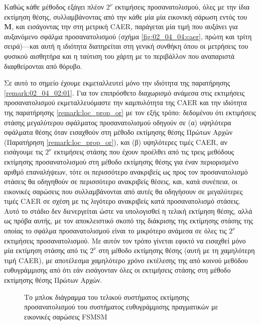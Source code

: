 Καθώς κάθε μέθοδος εξάγει πλέον $2^\nu$ εκτιμήσεις προσανατολισμού, όλες με την
ίδια εκτίμηση θέσης, συλλαμβάνοντας από την κάθε μία μία εικονική σάρωση εντός
του $\bm{M}$, και εισάγοντας την στη μετρική CAER, παράγεται μία τιμή που
αυξάνει για αυξανόμενο σφάλμα προσανατολισμού (σχήμα \ref{fig:02_04_04:caer},
πρώτη και τρίτη σειρά)---και αυτή η ιδιότητα διατηρείται στη γενική συνθήκη
όπου οι μετρήσεις του φυσικού αισθητήρα και η ταύτιση του χάρτη με το
περιβάλλον που αναπαριστά διαφθείρονται από θόρυβο.

Σε αυτό το σημείο έχουμε εκμεταλλευτεί μόνο την ιδιότητα της παρατήρησης
\ref{remark:02_04_02:01}. Για τον επιπρόσθετο διαχωρισμό ανάμεσα στις
εκτιμήσεις προσανατολισμού εκμεταλλευόμαστε την καμπυλότητα της CAER και την
ιδιότητα της παρατήρησης \ref{remark:loc_prop_or} με τον εξής τρόπο: δεδομένου
ότι εκτιμήσεις στάσης μεγαλύτερου σφάλματος  προσανατολισμού οδηγούν σε (α)
υψηλότερα σφάλματα θέσης όταν εισαχθούν στη μέθοδο εκτίμησης θέσης Πρώτων Αρχών
(Παρατήρηση \ref{remark:loc_prop_or}), και (β) υψηλότερες τιμές CAER, αν
εισάγουμε τις $2^\nu$ εκτιμήσεις στάσης που έχουν προέλθει από τις τρεις
μεθόδους εκτίμησης προσανατολισμού στη μέθοδο εκτίμησης θέσης για έναν
περιορισμένο αριθμό επαναλήψεων, τότε οι περισσότερο ανακριβείς ως προς τον
προσανατολισμό στάσεις θα οδηγηθούν σε περισσότερο ανακριβείς θέσεις, και, κατά
συνέπεια, οι εικονικές σαρώσεις που συλλαμβάνονται από αυτές θα οδηγήσουν σε
μεγαλύτερες τιμές CAER σε σχέση με τις λιγότερο ανακριβείς κατά προσανατολισμό
στάσεις. Αυτό το στάδιο δεν διενεργείται ώστε να υπολογισθεί η τελική εκτίμηση
θέσης, αλλά ως πρόβα αυτής, με τον αποκλειστικό σκοπό της διάκρισης της
εκτίμησης στάσης της οποίας το σφάλμα προσανατολισμού είναι το μικρότερο
ανάμεσα σε όλες τις $2^\nu$ εκτιμήσεις προσανατολισμού. Με αυτόν τον τρόπο
γίνεται εφικτό να εισαχθεί μόνο μία εκτίμηση στάσης από τις $2^\nu$ στη μέθοδο
εκτίμησης θέσης (αυτή με τη χαμηλότερη τιμή CAER), με αποτέλεσμα χαμηλότερο
χρόνο εκτέλεσης της από κοινού μεθόδου ευθυγράμμισης από ότι εάν εισάγονταν
όλες οι εκτιμήσεις στάσης στη μέθοδο εκτίμησης θέσης Πρώτων Αρχών.

\begin{figure}\centering
  
  \caption{\small Το μπλοκ διάγραμμα του τελικού συστήματος εκτίμησης
           προσανατολισμού του συστήματος ευθυγράμμισης πραγματικών με εικονικές
           σαρώσεις FSMSM}
  \label{fig:02_04_04:inner_rotation_system}
\end{figure}

